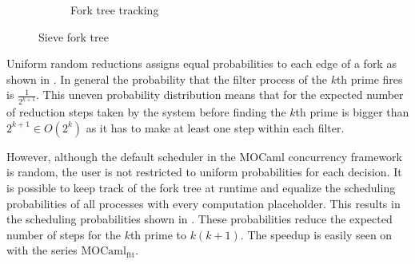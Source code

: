 \documentclass[12pt,twoside,notitlepage]{report}
\theoremstyle{plain}%
\theoremstyle{definition}
\theoremstyle{remark}
\begin{document}
\begin{figure}[H]
\begin{subfigure}[b]{0.45\linewidth}
\caption{Fork tree tracking}
\label{fig:sieve_ftt}
\end{subfigure}
%

%
%

%
\caption{Sieve fork tree}
\label{fig:sieve_fork_tree}
\end{figure}


Uniform random reductions assigns equal probabilities to each edge of a fork as shown in . In general the probability that the filter process of the $ k $th prime fires is $ \frac{1}{2^{k+1}} $. This uneven probability distribution means that for the expected number of reduction steps taken by the system before finding the $ k $th prime is bigger than $ 2^{k+1} \in O(2^{k}) $ as it has to make at least one step within each filter.

However, although the default scheduler in the MOCaml concurrency framework is random, the user is not restricted to uniform probabilities for each decision. It is possible to keep track of the fork tree at runtime and equalize the scheduling probabilities of all processes with every computation placeholder. This results in the scheduling probabilities shown in . These probabilities reduce the expected number of steps for the $ k $th prime to $ k(k+1) $. The speedup is easily seen on  with the series $ \text{MOCaml}_{\text{ftt}} $.
\end{document}
